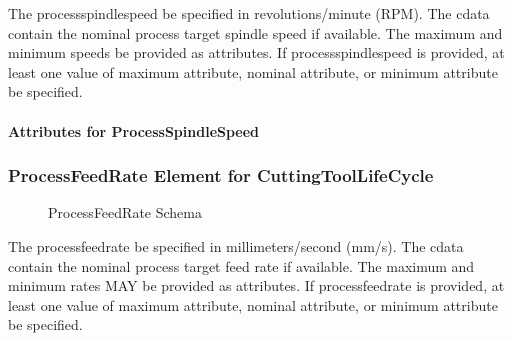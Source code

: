 \FloatBarrier

The \gls{processspindlespeed} \MUST be specified in revolutions/minute (RPM).  The \gls{cdata} \MAY contain the nominal process target spindle speed if available.  The maximum and minimum speeds \MAY be provided as attributes.  If \gls{processspindlespeed} is provided, at least one value of \gls{maximum attribute}, \gls{nominal attribute}, or \gls{minimum attribute} \MUST be specified.

\paragraph{Attributes for ProcessSpindleSpeed}\mbox{}



\clearpage

\subsubsection{ProcessFeedRate Element for CuttingToolLifeCycle}

\begin{figure}[ht]
  \centering
  \caption{ProcessFeedRate Schema}
  \label{fig:processfeedrate-schema}
\end{figure}

\FloatBarrier

The \gls{processfeedrate} \MUST be specified in millimeters/second (mm/s).  The \gls{cdata} \MAY contain the nominal process target feed rate if available.  The maximum and minimum rates MAY be provided as attributes.  If \gls{processfeedrate} is provided, at least one value of \gls{maximum attribute}, \gls{nominal attribute}, or \gls{minimum attribute} \MUST be specified.

